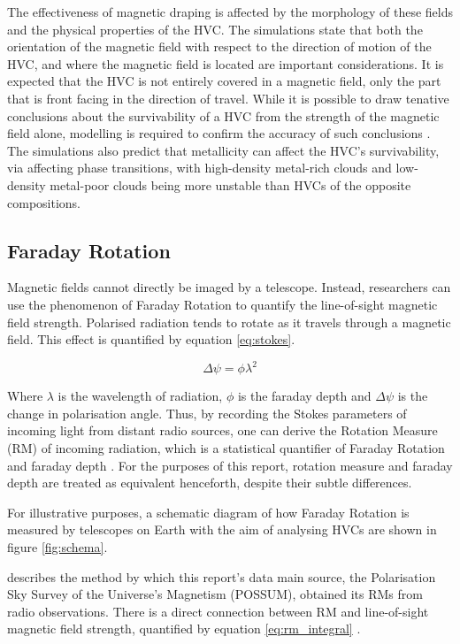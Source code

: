 The effectiveness of magnetic draping is affected by the morphology of these fields and the physical properties of the HVC. The \citeauthor{ID23} simulations state that both the orientation of the magnetic field with respect to the direction of motion of the HVC, and where the magnetic field is located are important considerations. It is expected that the HVC is not entirely covered in a magnetic field, only the part that is front facing in the direction of travel. While it is possible to draw tenative conclusions about the survivability of a HVC from the strength of the magnetic field alone, modelling is required to confirm the accuracy of such conclusions \citep{ID5}. The \citeauthor{ID23} simulations also predict that metallicity can affect the HVC's survivability, via affecting phase transitions, with high-density metal-rich clouds and low-density metal-poor clouds being more unstable than HVCs of the opposite compositions.

\subsection{Faraday Rotation}
\label{ssec:faraday}

Magnetic fields cannot directly be imaged by a telescope. Instead, researchers can use the phenomenon of Faraday Rotation to quantify the line-of-sight magnetic field strength. Polarised radiation tends to rotate as it travels through a magnetic field. This effect is quantified by equation \ref{eq:stokes}.

\begin{equation}
    \Delta\psi = \phi\lambda^2
    \label{eq:stokes}
\end{equation}


Where $\lambda$ is the wavelength of radiation, $\phi$ is the faraday depth and $\Delta\psi$ is the change in polarisation angle. Thus, by recording the Stokes parameters of incoming light from distant radio sources, one can derive the Rotation Measure (RM) of incoming radiation, which is a statistical quantifier of Faraday Rotation and faraday depth \citep{ID1, ID14}. For the purposes of this report, rotation measure and faraday depth are treated as equivalent henceforth, despite their subtle differences.


For illustrative purposes, a schematic diagram of how Faraday Rotation is measured by telescopes on Earth with the aim of analysing HVCs are shown in figure \ref{fig:schema}.


\cite{ID1} describes the method by which this report's data main source, the Polarisation Sky Survey of the Universe's Magnetism (POSSUM), obtained its RMs from radio observations. There is a direct connection between RM and line-of-sight magnetic field strength, quantified by equation \ref{eq:rm_integral} \citep{ID5, ID1, ID26, ID27, ID30}.


